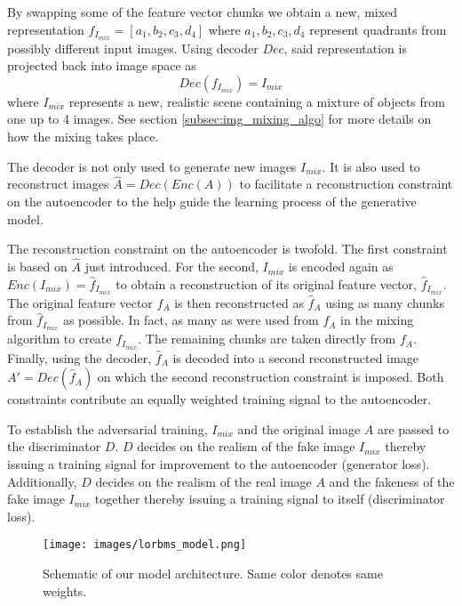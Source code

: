 \documentclass[12pt,a4paper]{article}
\begin{document}
By swapping some of the feature vector chunks we obtain a new, mixed representation $f_{I_{mix}} = [a_1, b_2, c_3, d_4]$ where $a_1,b_2,c_3,d_4$ represent quadrants from possibly different input images. Using decoder $Dec$, said representation is projected back into image space as
\begin{equation} \label{eq:3}
    Dec(f_{I_{mix}}) = I_{mix}
\end{equation}
where $I_{mix}$ represents a new, realistic scene containing a mixture of objects from one up to 4 images. See section \ref{subsec:img_mixing_algo} for more details on how the mixing takes place.

The decoder is not only used to generate new images $I_{mix}$. It is also used to reconstruct images $\hat{A} = Dec(Enc(A))$ to facilitate a reconstruction constraint on the autoencoder to the help guide the learning process of the generative model.

The reconstruction constraint on the autoencoder is twofold. The first constraint is based on $\hat{A}$ just introduced. For the second, $I_{mix}$ is encoded again as $Enc(I_{mix}) = \hat{f}_{I_{mix}}$ to obtain a reconstruction of its original feature vector, $\hat{f}_{I_{mix}}$. The original feature vector $f_A$ is then reconstructed as $\hat{f}_A$ using as many chunks from $\hat{f}_{I_{mix}}$ as possible. In fact, as many as were used from $f_A$ in the mixing algorithm to create $f_{I_{mix}}$. The remaining chunks are taken directly from $f_A$. Finally, using the decoder, $\hat{f}_A$ is decoded into a second reconstructed image $A' = Dec(\hat{f}_A)$ on which the second reconstruction constraint is imposed. Both constraints contribute an equally weighted training signal to the autoencoder.

To establish the adversarial training, $I_{mix}$ and the original image $A$ are passed to the discriminator $D$. $D$ decides on the realism of the fake image $I_{mix}$ thereby issuing a training signal for improvement to the autoencoder (generator loss). Additionally, $D$ decides on the realism of the real image $A$ and the fakeness of the fake image $I_{mix}$ together thereby issuing a training signal to itself (discriminator loss).

\begin{figure}[ht]
\centering
\texttt{[image: images/lorbms\_model.png]}
\caption{Schematic of our model architecture. Same color denotes same weights.}
\label{fig:model_arch}
\end{figure}
\end{document}
